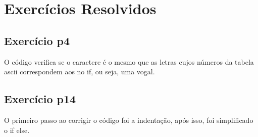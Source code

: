 \documentclass[12pt]{article}
\begin{document}
                \section{Exercícios Resolvidos}
                \subsection{Exercício p4}
                O código verifica se o caractere é o mesmo que as letras cujos números da tabela ascii
                correspondem aos no if, ou seja, uma vogal.
                \subsection{Exercício p14}
                O primeiro passo ao corrigir o código foi a indentação, após isso, foi simplificado
                o if else.
\end{document}
